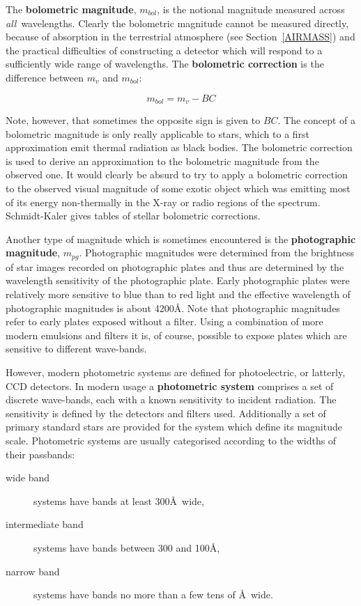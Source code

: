 \documentclass[twoside,11pt]{article}
\begin{document}
The {\bf bolometric magnitude}, $m_{bol}$, is the notional magnitude
measured across {\it all}\, wavelengths.  Clearly the bolometric magnitude
cannot be measured directly, because of absorption in the terrestrial
atmosphere (see Section~\ref{AIRMASS}) and the practical difficulties
of constructing a detector which will respond to a sufficiently wide
range of wavelengths.  The {\bf bolometric correction} is the difference
between $m_{v}$ and $m_{bol}$:

\begin{equation}
m_{bol}=m_v - BC
\end{equation}

Note, however, that sometimes the opposite sign is given to $BC$.
The concept of a bolometric magnitude is only really applicable to
stars, which to a first approximation emit thermal radiation as black
bodies.  The bolometric correction is used to derive an approximation
to the bolometric magnitude from the observed one.  It would clearly
be absurd to try to apply a bolometric correction to the observed visual
magnitude of some exotic object which was emitting most of its energy
non-thermally in the X-ray or radio regions of the spectrum.
Schmidt-Kaler\cite{SCHMIDTKALER82} gives tables of stellar bolometric
corrections.

Another type of magnitude which is sometimes encountered is the {\bf
photographic magnitude}, $m_{pg}$.  Photographic magnitudes were
determined from the brightness of star images recorded on photographic
plates and thus are determined by the wavelength sensitivity of the
photographic plate.  Early photographic plates were relatively more
sensitive to blue than to red light and the effective wavelength
of photographic magnitudes is about 4200\AA.  Note that photographic
magnitudes refer to early plates exposed without a filter.  Using a
combination of more modern emulsions and filters it is, of course,
possible to expose plates which are sensitive to different wave-bands.

However, modern photometric systems are defined for photoelectric,
or latterly, CCD detectors.  In modern usage a {\bf photometric system}
comprises a set of discrete wave-bands, each with a known sensitivity
to incident radiation.  The sensitivity is defined by the detectors
and filters used.  Additionally a set of primary standard stars are
provided for the system which define its magnitude scale.  Photometric
systems are usually categorised according to the widths of their
passbands:

\begin{description}

  \item[wide band] systems have bands at least 300\AA\ wide,

  \item[intermediate band] systems have bands between 300 and 100\AA,

  \item[narrow band] systems have bands no more than a few tens of
   \AA\ wide.

\end{description}
\end{document}
